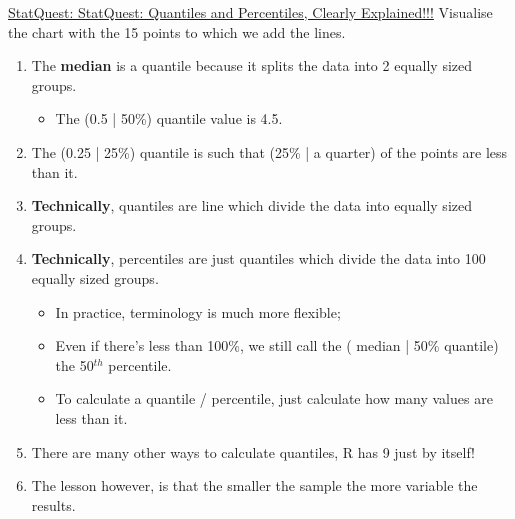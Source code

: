 \documentclass[12pt, titlepage, french]{report}
\begin{document}
\begin{YTB_SUMM}[label = {SQ-BASICS-QUANTILES}]{\href{https://www.youtube.com/watch?v=IFKQLDmRK0Y&feature=youtu.be}{StatQuest: StatQuest: Quantiles and Percentiles, Clearly Explained!!!}}
Visualise the chart with the 15 points to which we add the lines.
\begin{enumerate}
	\item	The \textbf{median} is a quantile because it splits the data into 2 equally sized groups.
	\begin{itemize}
		\item	The (0.5 | 50\%) quantile value is 4.5.
	\end{itemize}
	\item	The (0.25 | 25\%) quantile is such that (25\% | a quarter) of the points are less than it.
	\item	\textbf{Technically}, quantiles are line which divide the data into equally sized groups.
	\item	\textbf{Technically}, percentiles are just quantiles which divide the data into 100 equally sized groups.
	\begin{itemize}
		\item	In practice, terminology is much more flexible;
		\item	Even if there's less than 100\%, we still call the ( median | 50\% quantile) the 50$^{th}$ percentile.
		\item	To calculate a quantile / percentile, just calculate how many values are less than it.
	\end{itemize}
	\item	There are many other ways to calculate quantiles, R has 9 just by itself!
	\item	The lesson however, is that the smaller the sample the more variable the results.
\end{enumerate}
\end{YTB_SUMM}
\end{document}
